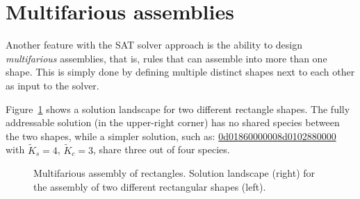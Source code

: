 \section{Multifarious assemblies}

Another feature with the SAT solver approach is the ability to design \emph{multifarious} assemblies, that is, rules that can assemble into more than one shape. This is simply done by defining multiple distinct shapes next to each other as input to the solver.

Figure~\ref{fig:multifarious_rectangles} shows a solution landscape for two different rectangle shapes. The fully addressable solution (in the upper-right corner) has no shared species between the two shapes, while a simpler solution, such as: \href{https://akodiat.github.io/polycubes/?assemblyMode=stochastic&rule=0d01860000000501860000000905020000008d0102880000}{0d0186000000\allowbreak8d0102880000}
with \(\widetilde{K}_s=4\), \(\widetilde{K}_c=3\), share three out of four species.

\begin{figure}[ht]
    \centering
    \caption{Multifarious assembly of rectangles. Solution landscape (right) for the assembly of two different rectangular shapes (left).}
    \label{fig:multifarious_rectangles}
\end{figure}